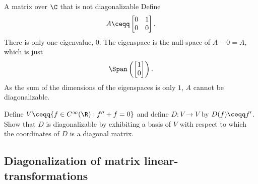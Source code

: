 \begin{exm}{A matrix over $\C$ that is not diagonalizable}{}
	Define
	\begin{equation}
		A\ceqq \begin{bmatrix}0 & 1 \\ 0 & 0\end{bmatrix}.
	\end{equation}
	There is only one eigenvalue, $0$.  The eigenspace is the null-space of $A-0=A$, which is just
	\begin{equation}
		\Span \left( \begin{bmatrix}1 \\ 0\end{bmatrix}\right) .
	\end{equation}
	As the sum of the dimensions of the eigenspaces is only $1$, $A$ cannot be diagonalizable.
\end{exm}
\begin{exr}{}{}
	Define $V\ceqq \{ f\in C^{\infty}(\R ):f''+f=0\}$ and define $D\colon V\rightarrow V$ by $D(f)\ceqq f'$.  Show that $D$ is diagonalizable by exhibiting a basis of $V$ with respect to which the coordinates of $D$ is a diagonal matrix.
\end{exr}

\subsection{Diagonalization of matrix linear-transformations}

